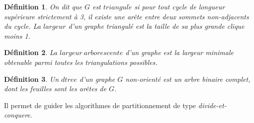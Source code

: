 \documentclass[handout]{beamer}
\newtheorem*{mdef}{Définition}
\begin{document}
\begin{frame}

\begin{mdef}
On dit que $G$ est $triangul\acute{e}$ si pour tout cycle de longueur supérieure
strictement à 3, il existe une arête entre deux sommets non-adjacents
du cycle. La $largeur$ d'un graphe triangulé est la taille de sa plus
grande clique moins 1.
\end{mdef}

\begin{mdef}
La $largeur\ arborescente$ d'un graphe est la largeur minimale obtenable
parmi toutes les triangulations possibles.
\end{mdef}

\begin{mdef}
Un $dtree$ d'un graphe $G$ non-orienté est un arbre binaire
complet, dont les feuilles sont les arêtes de $G$.
\end{mdef}

Il permet de guider les algorithmes de partitionnement de type
\emph{divide-et-conquere}.

\end{frame}
\end{document}
